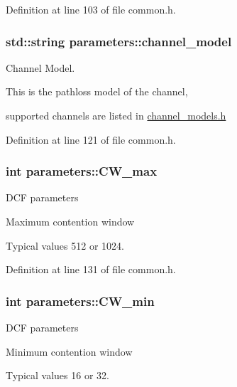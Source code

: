 Definition at line 103 of file common.\-h.

\hypertarget{structparameters_a16dba3ff81522c5acf14750929b461fc}{
\subsubsection[{channel\-\_\-model}]{\setlength{\rightskip}{0pt plus 5cm}std\-::string parameters\-::channel\-\_\-model}}\label{structparameters_a16dba3ff81522c5acf14750929b461fc}
Channel Model. \par
This is the pathloss model of the channel, \par
supported channels are listed in \hyperlink{channel__models_8h}{channel\-\_\-models.\-h} \par


Definition at line 121 of file common.\-h.

\hypertarget{structparameters_a7716151437acba90b37a7de2088da9da}{
\subsubsection[{C\-W\-\_\-max}]{\setlength{\rightskip}{0pt plus 5cm}int parameters\-::\-C\-W\-\_\-max}}\label{structparameters_a7716151437acba90b37a7de2088da9da}
D\-C\-F parameters \par
Maximum contention window \par
Typical values 512 or 1024. \par


Definition at line 131 of file common.\-h.

\hypertarget{structparameters_a80db9f2709f397239e827974d9c6deaa}{
\subsubsection[{C\-W\-\_\-min}]{\setlength{\rightskip}{0pt plus 5cm}int parameters\-::\-C\-W\-\_\-min}}\label{structparameters_a80db9f2709f397239e827974d9c6deaa}
D\-C\-F parameters \par
Minimum contention window \par
Typical values 16 or 32. \par


